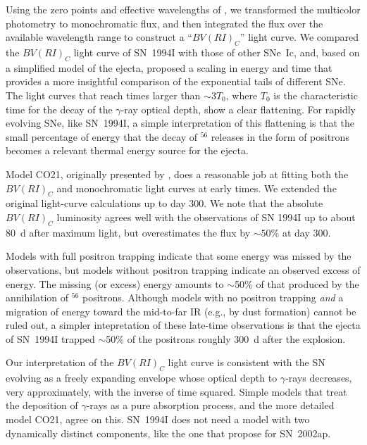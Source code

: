 \documentclass[12pt,manuscript]{aastex}
\begin{document}
Using the zero points and effective wavelengths of \citet{hol95}, we
transformed the multicolor photometry to monochromatic flux, and 
then integrated the flux over the available wavelength range to 
construct a ``$BV(RI)_C$'' light curve.
%
We compared the $BV(RI)_C$ light curve of SN~1994I with those of
other SNe~Ic, and, based on a simplified model of the ejecta, 
proposed a scaling in energy and time that provides a more 
insightful comparison of the exponential tails of different SNe.
%
The light curves that reach times larger than $\sim 3 T_0$, 
where $T_0$ is the characteristic time for the
decay of the $\gamma$-ray optical depth, show a clear flattening.
%
For rapidly evolving SNe, like SN~1994I, a simple interpretation 
of this flattening is that the small percentage of energy that the
decay of $^{56}$ releases in the form of positrons 
becomes a relevant thermal energy source for the ejecta.


Model CO21, originally presented by \citet{ietal94}, does a 
reasonable job at fitting both the $BV(RI)_C$ and monochromatic 
light curves at early times.
%
We extended the original light-curve calculations up to day 300. 
We note that the absolute $BV(RI)_C$ luminosity agrees well 
with the observations of SN 1994I up to about 80~d after maximum 
light, but overestimates the flux by $\sim 50$\% at day 300.


Models with full positron trapping indicate that some energy 
was missed by the observations, but models without positron 
trapping indicate an observed excess of energy.
%
The missing (or excess) energy amounts to $\sim$50\% of that 
produced by the annihilation of $^{56}$ positrons.
%
Although models with no positron trapping {\em and} a migration  
of energy toward the mid-to-far IR (e.g., by dust formation) 
cannot be ruled out, a simpler intepretation of these late-time 
observations is that the ejecta of SN~1994I trapped $\sim$50\% 
of the positrons roughly 300~d after the explosion.


Our interpretation of the $BV(RI)_C$ light curve
is consistent with the SN evolving as a freely expanding
envelope whose optical depth to $\gamma$-rays decreases,
very approximately, with the inverse of time squared.
%
Simple models that treat the deposition of $\gamma$-rays 
as a pure absorption process, and the more detailed model 
CO21, agree on this.
%
SN~1994I does not need a model with two dynamically distinct 
components, like the one that \citet{tetal06} propose for 
SN~2002ap.
\end{document}
